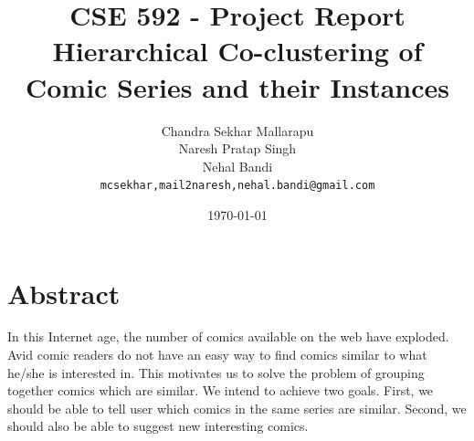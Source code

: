 \documentclass[11pt]{article}
\begin{document}
\title{CSE 592 - Project Report\\
  Hierarchical Co-clustering of Comic Series and their Instances}
\author{
  Chandra Sekhar Mallarapu\\
  Naresh Pratap Singh\\
  Nehal Bandi\\
  \texttt{mcsekhar,mail2naresh,nehal.bandi@gmail.com}}
\date{\today}
\maketitle
\titlepage
\tableofcontents
\listoffigures
\pagebreak

\section{Abstract}
In this Internet age, the number of comics available on the web have exploded. Avid comic readers do not have an easy way to find comics similar to what he/she is interested in. This motivates us to solve the problem of grouping together comics which are similar. We intend to achieve two goals. First, we should be able to tell user which comics in the same series are similar. Second, we should also be able to suggest new interesting comics.
\end{document}
